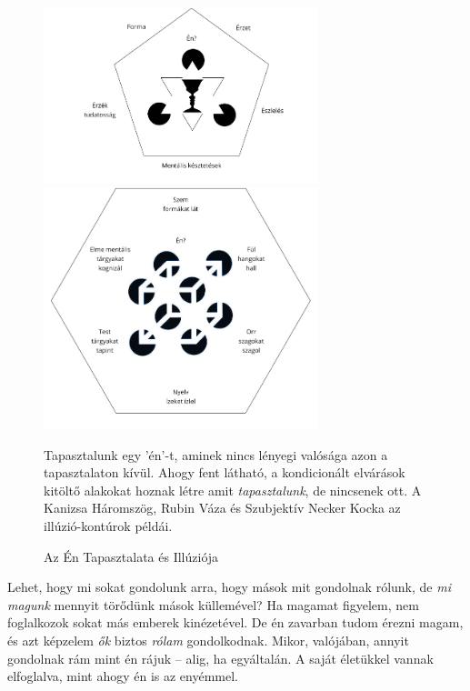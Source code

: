 \begin{figure}[h]
\caption{Az Én Tapasztalata és Illúziója}\label{fig-illusion-of-self}

\centering

\includegraphics[width=80mm]{./manuscript/tex/diagrams/khandhas-self-illusion-hu.pdf}

\bigskip

\includegraphics[width=80mm]{./manuscript/tex/diagrams/senses-self-illusion-hu.pdf}

\bigskip

{\small
Tapasztalunk egy 'én'-t, aminek nincs lényegi valósága azon a tapasztalaton kívül.
Ahogy fent látható, a kondicionált elvárások kitöltő alakokat hoznak létre
amit \emph{tapasztalunk}, de nincsenek ott.
A Kanizsa Háromszög, Rubin Váza és Szubjektív Necker Kocka az illúzió-kontúrok példái.
}


\end{figure}

\clearpage

Lehet, hogy mi sokat gondolunk arra, hogy mások mit gondolnak rólunk, de
\emph{mi magunk} mennyit törődünk mások küllemével? Ha magamat figyelem,
nem foglalkozok sokat más emberek kinézetével. De én zavarban tudom
érezni magam, és azt képzelem \emph{ők} biztos \emph{rólam}
gondolkodnak. Mikor, valójában, annyit gondolnak rám mint én rájuk --
alig, ha egyáltalán. A saját életükkel vannak elfoglalva, mint ahogy én
is az enyémmel.

